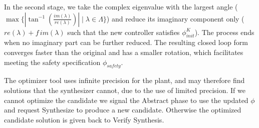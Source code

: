 \documentclass[a4paper,UKenglish]{lipics-v2018}
\begin{document}
In the second stage, we take the complex eigenvalue with the largest angle
($\max\{|\tan^{-1}\left(\frac{im(\lambda)}{re(\lambda)}\right)| \mid \lambda
\in \Lambda\}$) and reduce its imaginary component only ($re(\lambda) + f\,
im(\lambda)$ such that the new controller satisfies $\phi_\mathit{init}^K$). 
The process ends when no imaginary part can be further reduced.  The
resulting closed loop form converges faster than the original and has a
smaller rotation, which facilitates meeting the safety specification
$\phi_\mathit{safety}$.

The optimizer tool uses infinite precision for the
plant, and may therefore find solutions that the synthesizer cannot, due to
the use of limited precision.  If we cannot optimize the candidate we signal
the {\sc Abstract} phase to use the updated $\phi$ and request {\sc
Synthesize} to produce a new candidate.  Otherwise the optimized candidate
solution is given back to {\sc Verify Synthesis}.
\end{document}
